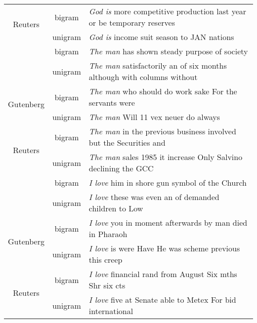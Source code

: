 \begin{tabular}{c|c|l}
  \multirow{2}{*}{Reuters} & bigram & \emph{God is} more competitive production last year or be temporary reserves \\
   & unigram & \emph{God is} income suit season to JAN nations \\\hhline{|=|=|=|} 
  \multirow{2}{*}{Brown}  & bigram & \emph{The man} has shown steady purpose of society \\
   & unigram & \emph{The man} satisfactorily an of six months although with columns without \\\hline
  \multirow{2}{*}{Gutenberg} & bigram & \emph{The man} who should do work sake For the servants were \\\
   & unigram & \emph{The man} Will 11 vex neuer do always \\\hline
  \multirow{2}{*}{Reuters} & bigram & \emph{The man} in the previous business involved but the Securities and \\
   & unigram & \emph{The man} sales 1985 it increase Only Salvino declining the GCC \\\hhline{|=|=|=|} 
  \multirow{2}{*}{Brown}  & bigram & \emph{I love} him in shore gun symbol of the Church \\
   & unigram & \emph{I love} these was even an of demanded children to Low \\\hline
  \multirow{2}{*}{Gutenberg} & bigram & \emph{I love} you in moment afterwards by man died in Pharaoh \\\
   & unigram & \emph{I love} is were Have He was scheme previous this creep \\\hline
  \multirow{2}{*}{Reuters} & bigram & \emph{I love} financial rand from August Six mths Shr six cts \\
   & unigram & \emph{I love} five at Senate able to Metex For bid international
\end{tabular}
